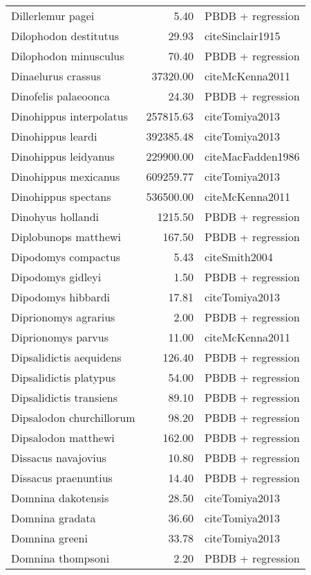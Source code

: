 \begin{table}[ht]
\begin{tabular}{lrl}
  Dillerlemur pagei & 5.40 & PBDB + regression \\ 
  Dilophodon destitutus & 29.93 & cite{Sinclair1915} \\ 
  Dilophodon minusculus & 70.40 & PBDB + regression \\ 
  Dinaelurus crassus & 37320.00 & cite{McKenna2011} \\ 
  Dinofelis palaeoonca & 24.30 & PBDB + regression \\ 
  Dinohippus interpolatus & 257815.63 & cite{Tomiya2013} \\ 
  Dinohippus leardi & 392385.48 & cite{Tomiya2013} \\ 
  Dinohippus leidyanus & 229900.00 & cite{MacFadden1986} \\ 
  Dinohippus mexicanus & 609259.77 & cite{Tomiya2013} \\ 
  Dinohippus spectans & 536500.00 & cite{McKenna2011} \\ 
  Dinohyus hollandi & 1215.50 & PBDB + regression \\ 
  Diplobunops matthewi & 167.50 & PBDB + regression \\ 
  Dipodomys compactus & 5.43 & cite{Smith2004} \\ 
  Dipodomys gidleyi & 1.50 & PBDB + regression \\ 
  Dipodomys hibbardi & 17.81 & cite{Tomiya2013} \\ 
  Diprionomys agrarius & 2.00 & PBDB + regression \\ 
  Diprionomys parvus & 11.00 & cite{McKenna2011} \\ 
  Dipsalidictis aequidens & 126.40 & PBDB + regression \\ 
  Dipsalidictis platypus & 54.00 & PBDB + regression \\ 
  Dipsalidictis transiens & 89.10 & PBDB + regression \\ 
  Dipsalodon churchillorum & 98.20 & PBDB + regression \\ 
  Dipsalodon matthewi & 162.00 & PBDB + regression \\ 
  Dissacus navajovius & 10.80 & PBDB + regression \\ 
  Dissacus praenuntius & 14.40 & PBDB + regression \\ 
  Domnina dakotensis & 28.50 & cite{Tomiya2013} \\ 
  Domnina gradata & 36.60 & cite{Tomiya2013} \\ 
  Domnina greeni & 33.78 & cite{Tomiya2013} \\ 
  Domnina thompsoni & 2.20 & PBDB + regression \\ 

\end{tabular}
\end{table}
